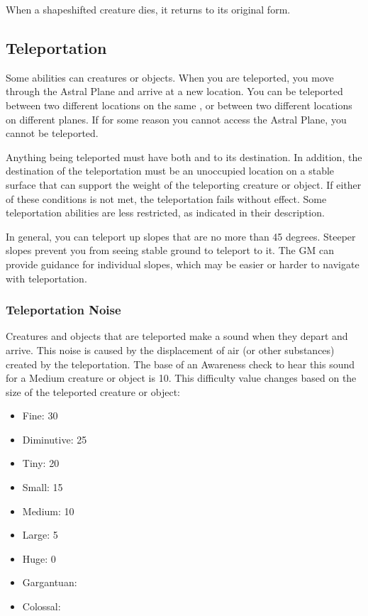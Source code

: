         When a shapeshifted creature dies, it returns to its original form.

    \subsection{Teleportation}\label{Teleportation}
        Some abilities can  creatures or objects.
        When you are teleported, you move through the Astral Plane and arrive at a new location.
        You can be teleported between two different locations on the same , or between two different locations on different planes.
        If for some reason you cannot access the Astral Plane, you cannot be teleported.

        Anything being teleported must have both  and  to its destination.
        In addition, the destination of the teleportation must be an unoccupied location on a stable surface that can support the weight of the teleporting creature or object.
        If either of these conditions is not met, the teleportation fails without effect.
        Some teleportation abilities are less restricted, as indicated in their description.

        In general, you can teleport up slopes that are no more than 45 degrees.
        Steeper slopes prevent you from seeing stable ground to teleport to it.
        The GM can provide guidance for individual slopes, which may be easier or harder to navigate with teleportation.

        \subsubsection{Teleportation Noise}\label{Teleportation Noise}
            Creatures and objects that are teleported make a sound when they depart and arrive.
            This noise is caused by the displacement of air (or other substances) created by the teleportation.
            The base  of an Awareness check to hear this sound for a Medium creature or object is 10.
            This difficulty value changes based on the size of the teleported creature or object:

            \begin{itemize}
                \item Fine: 30
                \item Diminutive: 25
                \item Tiny: 20
                \item Small: 15
                \item Medium: 10
                \item Large: 5
                \item Huge: 0
                \item Gargantuan: 
                \item Colossal: 
            \end{itemize}

